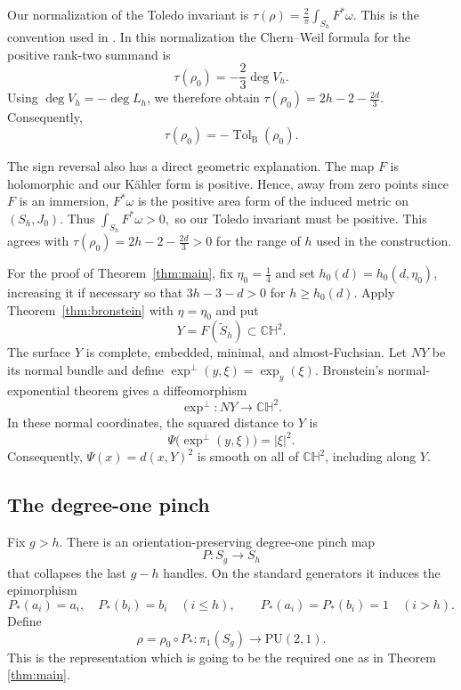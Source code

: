 \documentclass[12pt]{amsart}
\theoremstyle{remark}
\newcommand{\CH}{\mathbb{CH}}
\newcommand{\PU}{\mathrm{PU}}
\begin{document}
Our normalization of the Toledo invariant is
\(\tau(\rho)
    =\frac{2}{\pi}\int_{S_h}F^*\omega.
\)  This is the convention used in
\cite[Section~2.2, especially equation~(2.9) and the formula preceding
Remark~2.2]{LoftinMcIntosh}.  In this normalization the Chern--Weil formula
for the positive rank-two summand is
\[
    \tau(\rho_0)=-\frac23\deg V_h.
\]
Using $\deg V_h=-\deg L_h$, we therefore obtain
\(\tau(\rho_0) =2h-2-\frac{2d}{3}.
\)
Consequently,
\[
    \tau(\rho_0)
    =-\operatorname{Tol}_{\mathrm B}(\rho_0).
\]


The sign reversal also has a direct geometric explanation.  The map $F$ is
holomorphic and our K\"ahler form is positive.  Hence, away from zero points
since $F$ is an immersion,
\(
    F^*\omega
\)
is the positive area form of the induced metric on $(S_h,J_0)$.  Thus
\( \int_{S_h}F^*\omega>0,\)
so our Toledo invariant must be positive.  This agrees with
\(\tau(\rho_0)=2h-2-\frac{2d}{3}>0
\)
for the range of $h$ used in the construction. 


\bigskip 

For the proof of Theorem~\ref{thm:main}, fix $\eta_0=\tfrac14$ and set
$h_0(d)=h_0(d,\eta_0)$, increasing it if necessary so that
$3h-3-d>0$ for $h\ge h_0(d)$.  Apply Theorem~\ref{thm:bronstein} with
$\eta=\eta_0$ and put
\[
 Y=F(\widetilde S_h)\subset\CH^2.
\]
The surface $Y$ is complete, embedded, minimal, and almost-Fuchsian.  Let
$NY$ be its normal bundle and define
$\exp^\perp(y,\xi)=\exp_y(\xi)$.  Bronstein's normal-exponential theorem
\cite[Theorem~3.1]{BronsteinHadamard} gives a diffeomorphism
\begin{equation}\label{eq:normalexp}
 \exp^\perp:NY\longrightarrow\CH^2.
\end{equation}
In these normal coordinates, the squared distance to $Y$ is
\begin{equation}\label{eq:psi}
 \Psi\bigl(\exp^\perp(y,\xi)\bigr)=|\xi|^2.
\end{equation}
Consequently, $\Psi(x)=d(x,Y)^2$ is smooth on all of $\CH^2$, including along
$Y$.

\subsection{The degree-one pinch}

Fix $g>h$.  There is an orientation-preserving degree-one pinch map
\[
 P:S_g\longrightarrow S_h
\]
that collapses the last $g-h$ handles.  On the standard generators it induces
the epimorphism
\begin{equation}\label{eq:pinch}
 P_*(a_i)=a_i,\quad P_*(b_i)=b_i\quad(i\le h),
 \qquad
 P_*(a_i)=P_*(b_i)=1\quad(i>h).
\end{equation}
Define
\begin{equation}\label{eq:rho-pullback}
 \rho=\rho_0\circ P_*:\pi_1(S_g)\longrightarrow\PU(2,1).
\end{equation}
This is the representation which is going to be the required one as in Theorem \ref{thm:main}.
\end{document}
